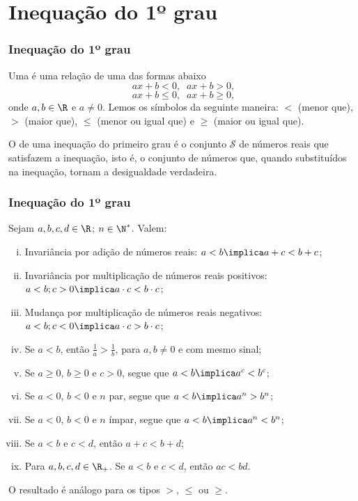 
\section{Inequação do 1º grau}
\begin{frame}
\frametitle{Inequação do 1º grau} 

\setcounter{teorema}{22}
\begin{definicao}
Uma  é uma relação de uma das formas
abaixo $$ax+b <0, \; \; ax+b>0,$$ $$ax+b \leq 0, \; \; ax+b \geq
0,$$ onde $a, b \in \R$ e $ a \neq 0$. Lemos os símbolos da seguinte
maneira: $<$ (menor que), $>$ (maior que), $\leq$ (menor ou igual
que) e $\geq$ (maior ou igual que).
\end{definicao}

O  de uma inequação do primeiro grau é o
conjunto $\mathcal{S}$ de números reais que satisfazem a inequação,
isto é, o conjunto de números que, quando substituídos na inequação,
tornam a desigualdade verdadeira.

\end{frame}


\begin{frame}
\frametitle{Inequação do 1º grau} 

\begin{proposicao}
Sejam $a, b, c, d \in \R$; $n \in \N^*$. Valem:
\begin{enumerate}[i.]
	\item Invariância por adição de números reais: $a < b \implica a+c < b+c$;
	\item Invariância por multiplicação de números reais positivos:
	$a < b ; c>0 \implica a \cdot c < b \cdot c$;
	\item Mudança por multiplicação de números reais
	negativos: $a < b ; c<0 \implica a \cdot c > b \cdot c$;
	\item Se $a < b$, então $\frac 1 a > \frac 1 b$, para $a, b \neq 0$ e com mesmo sinal;
	\item Se $a \geq 0$, $b \geq 0$ e $c>0$, segue que $a < b \implica a^c < b^c$;
	\item Se $a< 0$, $b < 0$ e $n$ par, segue que $a < b \implica a^n > b^n$;
	\item Se $a<0$, $b < 0$ e $n$ ímpar, segue que $a < b \implica a^n <
	b^n$;
	\item Se $a< b$ e $c< d$, então $a+c < b+d$;
	\item Para $a, b, c, d \in \R_+$. Se $a< b$ e $c< d$, então $ac < bd$.
\end{enumerate}
O resultado é análogo para os tipos $>$, $\leq$ ou $\geq$.
\end{proposicao}


\end{frame}


